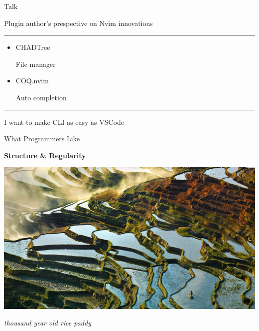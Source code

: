 \documentclass{beamer}
\begin{document}
\begin{frame}{Talk}

	Plugin author's prespective on Nvim innovations

	\rule{\textwidth}{0.1em}

	\begin{itemize}

		\item CHADTree

		      File manager

		      \hspace{0.1em}

		\item COQ.nvim

		      Auto completion

	\end{itemize}

	\rule{\textwidth}{0.1em}

	I want to make CLI as easy as VSCode

\end{frame}


\begin{frame}{What Programmers Like}

	\textbf{Structure \& Regularity}

	\includegraphics[width=\textwidth]{rice_paddy}

	\textit{thousand year old rice paddy}

\end{frame}
\end{document}
